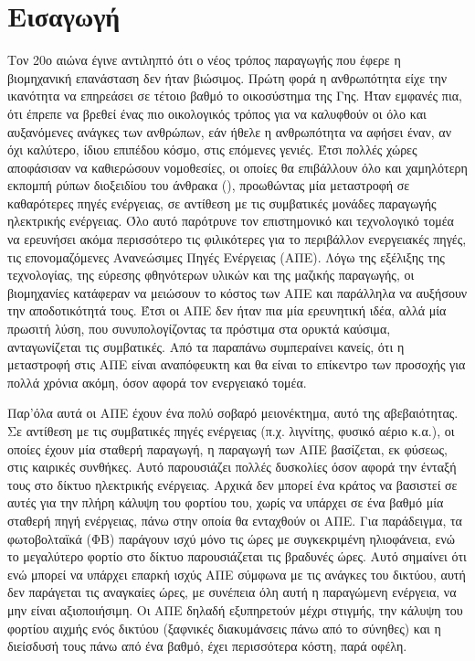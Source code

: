 \documentclass[12pt]{report}
\begin{document}
\chapter*{Εισαγωγή}
Τον 20ο αιώνα έγινε αντιληπτό ότι ο νέος τρόπος παραγωγής που έφερε η βιομηχανική επανάσταση δεν ήταν βιώσιμος. Πρώτη φορά η ανθρωπότητα είχε την ικανότητα
να επηρεάσει σε τέτοιο βαθμό το οικοσύστημα της Γης. Ήταν εμφανές πια, ότι έπρεπε να βρεθεί ένας πιο οικολογικός τρόπος για να καλυφθούν οι όλο και αυξανόμενες ανάγκες των ανθρώπων, εάν 
ήθελε η ανθρωπότητα να αφήσει έναν, αν όχι καλύτερο, ίδιου επιπέδου κόσμο, στις επόμενες γενιές.
Έτσι πολλές χώρες αποφάσισαν να καθιερώσουν νομοθεσίες, οι οποίες θα επιβάλλουν όλο και χαμηλότερη
εκπομπή ρύπων διοξειδίου του άνθρακα ({}), προωθώντας μία μεταστροφή σε καθαρότερες πηγές ενέργειας, σε αντίθεση με τις συμβατικές μονάδες παραγωγής ηλεκτρικής ενέργειας.
Όλο αυτό παρότρυνε τον επιστημονικό και τεχνολογικό τομέα να ερευνήσει ακόμα περισσότερο τις φιλικότερες για το περιβάλλον ενεργειακές πηγές, τις επονομαζόμενες Ανανεώσιμες Πηγές Ενέργειας (ΑΠΕ). 
Λόγω της εξέλιξης της τεχνολογίας, της εύρεσης φθηνότερων υλικών και της μαζικής παραγωγής, οι βιομηχανίες κατάφεραν να μειώσουν το κόστος των ΑΠΕ και παράλληλα να αυξήσουν την αποδοτικότητά τους.
Έτσι οι ΑΠΕ δεν ήταν πια μία ερευνητική ιδέα, αλλά μία πρωσιτή λύση, που συνυπολογίζοντας τα πρόστιμα στα ορυκτά καύσιμα, ανταγωνίζεται τις συμβατικές.
Από τα παραπάνω συμπεραίνει κανείς, ότι η μεταστροφή στις ΑΠΕ είναι αναπόφευκτη και θα είναι το επίκεντρο των προσοχής για πολλά χρόνια ακόμη, όσον αφορά τον ενεργειακό τομέα. 

Παρ'όλα αυτά οι ΑΠΕ έχουν ένα πολύ σοβαρό μειονέκτημα, αυτό της αβεβαιότητας. Σε αντίθεση με τις συμβατικές πηγές ενέργειας (π.χ. λιγνίτης, φυσικό αέριο κ.α.), οι οποίες
έχουν μία σταθερή παραγωγή, η παραγωγή των ΑΠΕ βασίζεται, εκ φύσεως, στις καιρικές συνθήκες. Αυτό παρουσιάζει πολλές δυσκολίες όσον αφορά την ένταξή τους στο δίκτυο ηλεκτρικής ενέργειας.
Αρχικά δεν μπορεί ένα κράτος να βασιστεί σε αυτές για την πλήρη κάλυψη του φορτίου του, χωρίς να υπάρχει σε ένα βαθμό μία σταθερή πηγή ενέργειας, πάνω στην οποία θα ενταχθούν οι ΑΠΕ.
Για παράδειγμα, τα φωτοβολταϊκά (ΦΒ) παράγουν ισχύ μόνο τις ώρες με συγκεκριμένη ηλιοφάνεια, ενώ το μεγαλύτερο φορτίο στο δίκτυο παρουσιάζεται τις βραδυνές ώρες. Αυτό σημαίνει ότι ενώ μπορεί να υπάρχει επαρκή ισχύς ΑΠΕ
σύμφωνα με τις ανάγκες του δικτύου, αυτή δεν παράγεται τις αναγκαίες ώρες, με συνέπεια όλη αυτή η παραγώμενη ενέργεια, να μην είναι αξιοποιήσιμη. Οι ΑΠΕ δηλαδή εξυπηρετούν μέχρι στιγμής, την κάλυψη του φορτίου αιχμής
ενός δικτύου (ξαφνικές διακυμάνσεις πάνω από το σύνηθες) και η διείσδυσή τους πάνω από ένα βαθμό, έχει περισσότερα κόστη, παρά οφέλη. 
\end{document}
